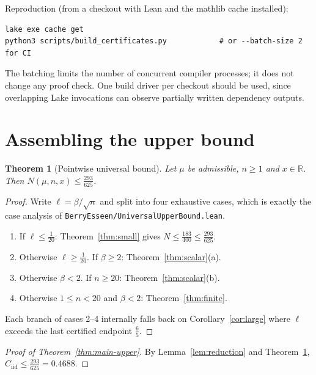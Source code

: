 \documentclass[10pt,a4paper]{article}
\theoremstyle{plain}
\newtheorem{theorem}{Theorem}[section]
\theoremstyle{definition}
\newcommand{\R}{\mathbb{R}}
\newcommand{\Cii}{C_{\mathrm{iid}}}
\newcommand{\file}[1]{\texttt{#1}}
\begin{document}
Reproduction (from a checkout with Lean and the mathlib cache installed):
\begin{verbatim}
lake exe cache get
python3 scripts/build_certificates.py            # or --batch-size 2 for CI
\end{verbatim}
The batching limits the number of concurrent compiler processes; it does not
change any proof check. One build driver per checkout should be used, since
overlapping Lake invocations can observe partially written dependency outputs.

\section{Assembling the upper bound}
\label{sec:assembly}

\begin{theorem}[Pointwise universal bound]\label{thm:pointwise}
Let $\mu$ be admissible, $n\ge1$ and $x\in\R$. Then
$N(\mu,n,x)\le\tfrac{293}{625}$.
\end{theorem}

\begin{proof}
Write $\ell=\beta/\sqrt n$ and split into four exhaustive cases, which is
exactly the case analysis of \file{BerryEsseen/UniversalUpperBound.lean}.
\begin{enumerate}[leftmargin=2.2em]
\item If $\ell\le\tfrac1{20}$: Theorem~\ref{thm:small} gives
  $N\le\tfrac{183}{400}\le\tfrac{293}{625}$.
\item Otherwise $\ell\ge\tfrac1{20}$. If $\beta\ge2$:
  Theorem~\ref{thm:scalar}(a).
\item Otherwise $\beta<2$. If $n\ge20$: Theorem~\ref{thm:scalar}(b).
\item Otherwise $1\le n<20$ and $\beta<2$: Theorem~\ref{thm:finite}.
\end{enumerate}
Each branch of cases 2--4 internally falls back on Corollary~\ref{cor:large}
where $\ell$ exceeds the last certified endpoint $\tfrac65$.
\end{proof}

\begin{proof}[Proof of Theorem~\ref{thm:main-upper}]
By Lemma~\ref{lem:reduction} and Theorem~\ref{thm:pointwise},
$\Cii\le\tfrac{293}{625}=0.4688$.
\end{proof}
\end{document}
